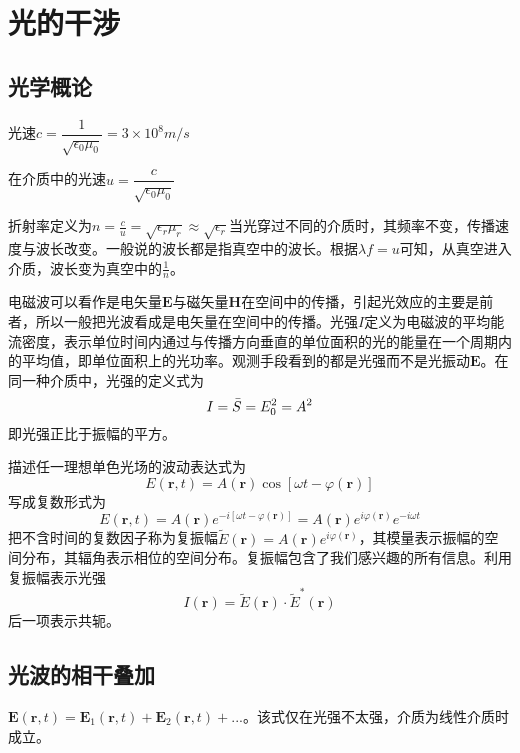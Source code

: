 \section{光的干涉}
\subsection{光学概论}
光速$c=\dfrac{1}{\sqrt{\epsilon_0 \mu_0}}=3\times 10^{8}m/s$

在介质中的光速$u=\dfrac{c}{\sqrt{\epsilon_0 \mu_0}}$

折射率定义为$n=\frac{c}{u}=\sqrt{\epsilon_r \mu_r}\approx \sqrt{\epsilon_r}$当光穿过不同的介质时，其频率不变，传播速度与波长改变。一般说的波长都是指真空中的波长。根据$\lambda f=u$可知，从真空进入介质，波长变为真空中的$\frac{1}{n}$。

电磁波可以看作是电矢量$\bm{E}$与磁矢量$\bm{H}$在空间中的传播，引起光效应的主要是前者，所以一般把光波看成是电矢量在空间中的传播。光强$I$定义为电磁波的平均能流密度，表示单位时间内通过与传播方向垂直的单位面积的光的能量在一个周期内的平均值，即单位面积上的光功率。观测手段看到的都是光强而不是光振动$\bm{E}$。在同一种介质中，光强的定义式为
\begin{equation}
    I=\Bar{S}=E_0^2=A^2
\end{equation}
即光强正比于振幅的平方。

 描述任一理想单色光场的波动表达式为
\begin{equation}
    E(\bm{r},t)=A(\bm{r})\cos [\omega t-\varphi(\bm{r})]
\end{equation}
写成复数形式为
\begin{equation}
    E(\bm{r},t)=A(\bm{r})e^{-i[\omega t-\varphi(\bm{r})]}=A(\bm{r})e^{i\varphi(\bm{r})}e^{-i\omega t}
\end{equation}
把不含时间的复数因子称为复振幅$\widetilde{E}(\bm{r})=A(\bm{r})e^{i\varphi(\bm{r})}$，其模量表示振幅的空间分布，其辐角表示相位的空间分布。复振幅包含了我们感兴趣的所有信息。利用复振幅表示光强
\begin{equation}
    I(\bm{r})=\widetilde{E}(\bm{r}) \cdot \widetilde{E}^* (\bm{r})
\end{equation}
后一项表示共轭。
\subsection{光波的相干叠加}
$\bm{E}(\bm{r},t)=\bm{E}_1(\bm{r},t)+\bm{E}_2(\bm{r},t)+ ...$。该式仅在光强不太强，介质为线性介质时成立。

